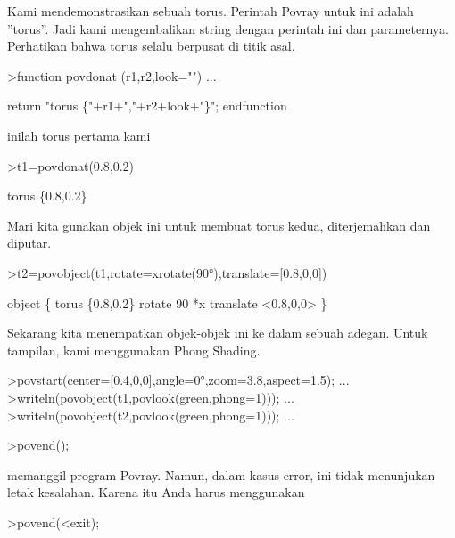\documentclass[a4paper,10pt]{article}
\begin{document}
\begin{eulernotebook}
\begin{eulercomment}
\begin{eulercomment}
\begin{eulercomment}
Kami mendemonstrasikan sebuah torus. Perintah Povray untuk ini adalah
”torus”. Jadi kami mengembalikan string dengan perintah ini dan
parameternya. Perhatikan bahwa torus selalu berpusat di titik asal.
\end{eulercomment}
\begin{eulerprompt}
>function povdonat (r1,r2,look="") ...
\end{eulerprompt}
\begin{eulerudf}
    return "torus \{"+r1+","+r2+look+"\}";
  endfunction
\end{eulerudf}
\begin{eulercomment}
inilah torus pertama kami
\end{eulercomment}
\begin{eulerprompt}
>t1=povdonat(0.8,0.2)
\end{eulerprompt}
\begin{euleroutput}
  torus \{0.8,0.2\}
\end{euleroutput}
\begin{eulercomment}
Mari kita gunakan objek ini untuk membuat torus kedua, diterjemahkan
dan diputar.
\end{eulercomment}
\begin{eulerprompt}
>t2=povobject(t1,rotate=xrotate(90°),translate=[0.8,0,0])
\end{eulerprompt}
\begin{euleroutput}
  object \{ torus \{0.8,0.2\}
   rotate 90 *x 
   translate <0.8,0,0>
   \}
\end{euleroutput}
\begin{eulercomment}
Sekarang kita menempatkan objek-objek ini ke dalam sebuah adegan.
Untuk tampilan, kami menggunakan Phong Shading.
\end{eulercomment}
\begin{eulerprompt}
>povstart(center=[0.4,0,0],angle=0°,zoom=3.8,aspect=1.5); ...
>writeln(povobject(t1,povlook(green,phong=1))); ...
>writeln(povobject(t2,povlook(green,phong=1))); ...
\end{eulerprompt}
\begin{eulerttcomment}
 >povend();
\end{eulerttcomment}
\begin{eulercomment}
memanggil program Povray. Namun, dalam kasus error, ini tidak
menunjukan letak kesalahan. Karena itu Anda harus menggunakan

\end{eulercomment}
\begin{eulerttcomment}
 >povend(<exit);
\end{eulerttcomment}
\begin{eulercomment}


\end{eulercomment}
\end{eulercomment}
\end{eulercomment}
\end{eulernotebook}
\end{document}
